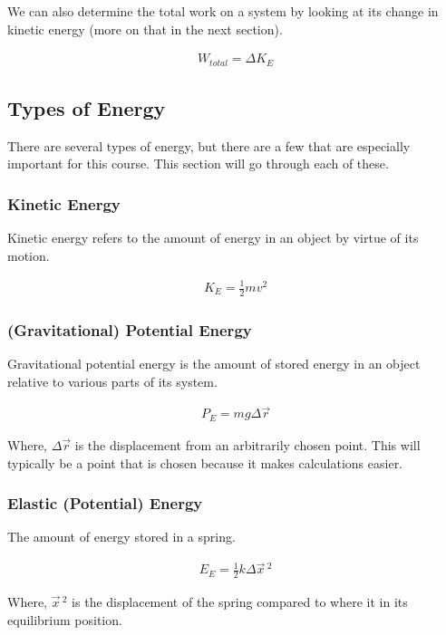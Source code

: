 \documentclass{article}
\begin{document}
We can also determine the total work on a system by looking at its
change in kinetic energy (more on that in the next section).

\begin{eqnarray}
    W_{total} = \Delta K_E
\end{eqnarray}

\subsection{Types of Energy}
There are several types of energy, but there are a few that are especially
important for this course. This section will go through each of these.

\subsubsection{Kinetic Energy}
Kinetic energy refers to the amount of energy in an object by
virtue of its motion.

\begin{eqnarray}
    K_E = \frac{1}{2}mv^2
\end{eqnarray}

\subsubsection{(Gravitational) Potential Energy}
Gravitational potential energy is the amount of stored energy in an
object relative to various parts of its system.

\begin{eqnarray}
    P_E = mg \Delta \vec{r}
\end{eqnarray}

\noindent Where, $\Delta \vec{r}$ is the displacement from an arbitrarily
chosen point. This will typically be a point that is chosen because it makes
calculations easier.

\subsubsection{Elastic (Potential) Energy}
The amount of energy stored in a spring.

\begin{eqnarray}
    E_E = \frac{1}{2} k \Delta \vec{x} \, ^2
\end{eqnarray}

\noindent Where, $\vec{x} \, ^2$ is the displacement of the spring
compared to where it in its equilibrium position.
\end{document}
